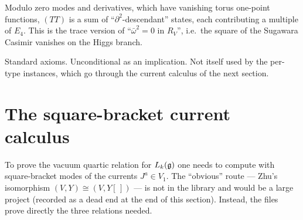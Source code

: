 \begin{physics}
Modulo zero modes and derivatives, which have vanishing torus one-point functions, $(TT)$ is a sum of
``$\partial^2$-descendant'' states, each contributing a multiple of $E_4$. This is the trace version of
``$\bar\omega^2=0$ in $R_V$'', i.e.\ the square of the Sugawara Casimir vanishes on the Higgs branch.
\end{physics}
\begin{status}
Standard axioms. Unconditional as an implication. Not itself used by the per-type instances, which go through the
current calculus of the next section.
\end{status}

\section{The square-bracket current calculus}\label{l25:sec:zhu}

To prove the vacuum quartic relation for $L_k(\mathfrak g)$ one needs to compute with square-bracket modes of the
currents $J^a\in V_1$. The ``obvious'' route --- Zhu's isomorphism $(V,Y)\cong(V,Y[\,])$ --- is not in the
library and would be a large project (recorded as a dead end at the end of this section). Instead, the files
 prove directly the three relations needed.

